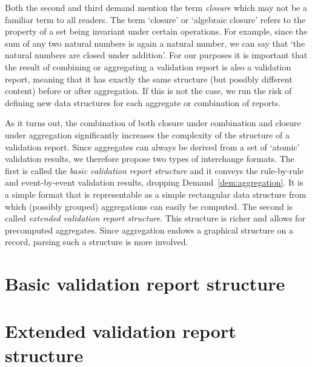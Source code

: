 \documentclass[a4paper, 11pt]{article}
\begin{document}
Both the second and third demand mention the term \emph{closure} which may not be a
familiar term to all readers. The term `closure' or `algebraic closure' refers
to the property of a set being invariant under certain operations. For example,
since the sum of any two natural numbers is again a natural number, we can say
that ‘the natural numbers are closed under addition’. For our purposes it is
important that the result of combining or aggregating a validation report is
also a validation report, meaning that it has exactly the same structure (but
possibly different content) before or after aggregation. If this is not the
case, we run the risk of defining new data structures for each aggregate or
combination of reports.

As it turns out, the combination of both closure under combination and closure
under aggregation significantly increases the complexity of the structure of a
validation report. Since aggregates can always be derived from a set of
`atomic' validation results, we therefore propose two types of interchange
formats. The first is called the \emph{basic validation report structure} and
it conveys the rule-by-rule and event-by-event validation results, dropping
Demand~\ref{dem:aggregation}. It is a simple format that is representable as a
simple rectangular data structure from which (possibly grouped) aggregations
can easily be computed.  The second is called \emph{extended validation report
structure}. This structure is richer and allows for precomputed aggregates.
Since aggregation endows a graphical structure on a record, parsing such a
structure is more involved.



\section{Basic validation report structure}



\section{Extended validation report structure}


\end{document}
